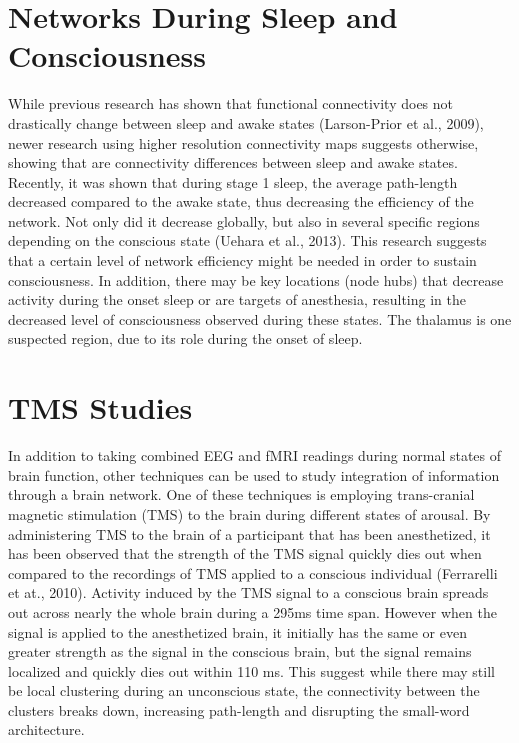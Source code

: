 \documentclass[12pt,letterpaper]{report}
\begin{document}
\section{Networks During Sleep and Consciousness}
	While previous research has shown that functional connectivity does not drastically change between sleep and awake states (Larson-Prior et al., 2009), newer research using higher resolution connectivity maps suggests otherwise, showing that are connectivity differences between sleep and awake states. Recently, it was shown that during stage 1 sleep, the average path-length decreased compared to the awake state, thus decreasing the efficiency of the network. Not only did it decrease globally, but also in several specific regions depending on the conscious state (Uehara et al., 2013). This research suggests that a certain level of network efficiency might be needed in order to sustain consciousness. In addition, there may be key locations (node hubs) that decrease activity during the onset sleep or are targets of anesthesia, resulting in the decreased level of consciousness observed during these states. The thalamus is one suspected region, due to its role during the onset of sleep.
\section{TMS Studies}
	In addition to taking combined EEG and fMRI readings during normal states of brain function, other techniques can be used to study integration of information through a brain network. One of these techniques is employing trans-cranial magnetic stimulation (TMS) to the brain during different states of arousal. By administering TMS to the brain of a participant that has been anesthetized, it has been observed that the strength of the TMS signal quickly dies out when compared to the recordings of TMS applied to a conscious individual (Ferrarelli et at., 2010).  Activity induced by the TMS signal to a conscious brain spreads out across nearly the whole brain during a 295ms time span. However when the signal is applied to the anesthetized brain, it initially has the same or even greater strength as the signal in the conscious brain, but the signal remains localized and quickly dies out within 110 ms. This suggest while there may still be local clustering during an unconscious state, the connectivity between the clusters breaks down, increasing path-length and disrupting the small-word architecture. 
\end{document}
